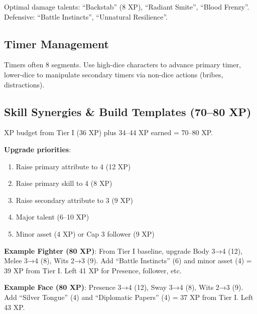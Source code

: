 \documentclass[11pt]{article}
\begin{document}
Optimal damage talents: ``Backstab'' (8 XP), ``Radiant Smite'', ``Blood Frenzy''. Defensive: ``Battle Instincts'', ``Unnatural Resilience''.

\subsection{Timer Management}
Timers often 8 segments. Use high-dice characters to advance primary timer, lower-dice to manipulate secondary timers via non-dice actions (bribes, distractions).

\subsection{Skill Synergies \& Build Templates (70–80 XP)}
XP budget from Tier I (36 XP) plus 34–44 XP earned = 70–80 XP.

\textbf{Upgrade priorities}:
\begin{enumerate}
    \item Raise primary attribute to 4 (12 XP)
    \item Raise primary skill to 4 (8 XP)
    \item Raise secondary attribute to 3 (9 XP)
    \item Major talent (6–10 XP)
    \item Minor asset (4 XP) or Cap 3 follower (9 XP)
\end{enumerate}

\textbf{Example Fighter (80 XP)}: From Tier I baseline, upgrade Body 3→4 (12), Melee 3→4 (8), Wits 2→3 (9). Add ``Battle Instincts'' (6) and minor asset (4) = 39 XP from Tier I. Left 41 XP for Presence, follower, etc.

\textbf{Example Face (80 XP)}: Presence 3→4 (12), Sway 3→4 (8), Wits 2→3 (9). Add ``Silver Tongue'' (4) and ``Diplomatic Papers'' (4) = 37 XP from Tier I. Left 43 XP.
\end{document}
